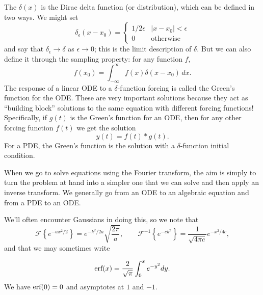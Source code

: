 \documentclass[../m180main.tex]{subfiles}
\begin{document}
The $\delta(x)$ is the Dirac delta function (or distribution), which can be defined in two ways.
We might set
\[ \delta_\epsilon(x - x_0) = \begin{cases} 1 / 2\epsilon & |x - x_0| < \epsilon \\ 0 & \textrm{otherwise} \end{cases} \]
and say that $\delta_\epsilon \to \delta$ as $\epsilon \to 0$; this is the limit description of $\delta$.
But we can also define it through the sampling property: for any function $f$,
\[ f(x_0) = \int_{-\infty}^{\infty} f(x) \delta(x - x_0) \,dx. \]
The response of a linear ODE to a $\delta$-function forcing is called the Green's function for the ODE.
These are very important solutions because they act as ``building block'' solutions to the same equation with different forcing functions!
Specifically, if $g(t)$ is the Green's function for an ODE, then for any other forcing function $f(t)$ we get the solution
\[ y(t) = f(t) * g(t). \]
For a PDE, the Green's function is the solution with a $\delta$-function initial condition.

When we go to solve equations using the Fourier transform, the aim is simply to turn the problem at hand into a simpler one that we can solve and then apply an inverse transform.
We generally go from an ODE to an algebraic equation and from a PDE to an ODE.

We'll often encounter Gaussians in doing this, so we note that
\[ \mathcal F \left\{ e^{-ax^2 / 2} \right\} = e^{-k^2 / 2a} \sqrt{\frac{2\pi}{a}}, \qquad \mathcal F^{-1} \left\{ e^{-ck^2} \right\} = \frac{1}{\sqrt{4\pi c}} e^{-x^2 / 4c}, \]
and that we may sometimes write

\[ \textrm{erf}(x) = \frac{2}{\sqrt{\pi}} \int_{0}^{x} e^{-y^2} dy. \]
We have $\textrm{erf}(0) = 0$ and asymptotes at $1$ and $-1$.
\end{document}
